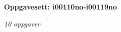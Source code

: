 \centerline{\bf Oppgavesett: i00110no-i00119no}
\vskip 10pt
\centerline{\it 10 oppgaver}\vskip 10pt
\vskip 10pt
